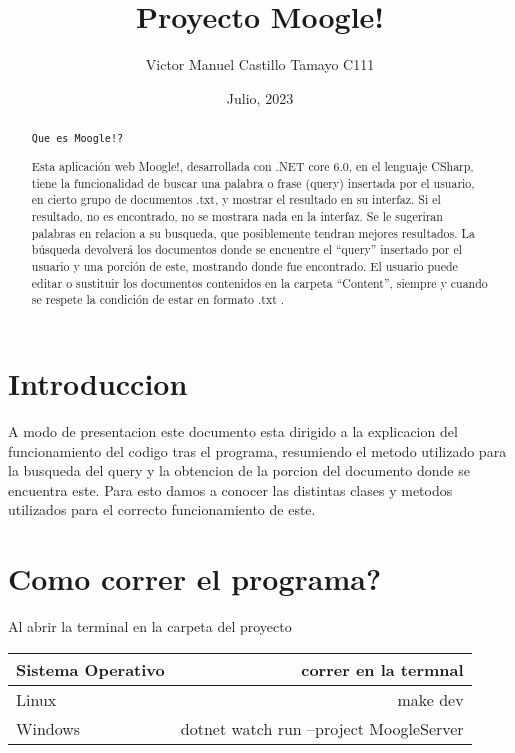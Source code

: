 \documentclass[a4paper, 12pt]{article}
\author{Victor Manuel Castillo Tamayo C111}
\title{Proyecto Moogle!}
\date{Julio, 2023}
\begin{document}
	\maketitle
	\begin{abstract}
		\begin{center}
			\large\texttt{Que es Moogle!?}
		\end{center}
		Esta aplicación web Moogle!, desarrollada con .NET core 6.0, en el lenguaje CSharp, tiene la funcionalidad de buscar una palabra o frase (query) insertada por el usuario, en cierto grupo de documentos .txt, y mostrar el resultado en su interfaz. Si el resultado, no es encontrado, no se mostrara nada en la interfaz. Se le sugeriran palabras en relacion a su busqueda, que posiblemente tendran mejores resultados. La búsqueda devolverá los documentos donde se encuentre el “query” insertado por el usuario y una porción de este, mostrando donde fue encontrado. El usuario puede editar o sustituir los documentos contenidos en la carpeta “Content”, siempre y cuando se respete la condición de estar en formato .txt .
	\end{abstract}
	\section{Introduccion}\label{sec:intro}
		A modo de presentacion este documento esta dirigido a la explicacion del funcionamiento del codigo tras el programa, resumiendo el metodo utilizado para la busqueda del query y la obtencion de la porcion del documento donde se encuentra este. Para esto damos a conocer las distintas clases y metodos utilizados para el correcto funcionamiento de este.
	\section{Como correr el programa?}
		Al abrir la terminal en la carpeta del proyecto
		\begin{center}
		\begin{tabular}{l|r}
		Sistema Operativo & correr en la termnal\\
		\hline
		Linux & make dev\\
		Windows & dotnet watch run --project MoogleServer\\
		\end{tabular}
		\end{center}
\end{document}
